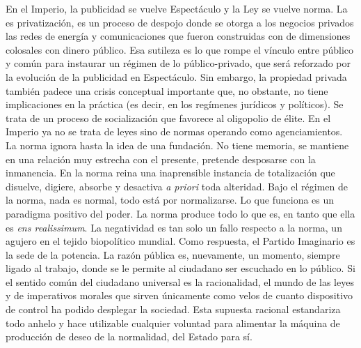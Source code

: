 En el Imperio, la publicidad se vuelve Espectáculo y la Ley se vuelve norma. La  es privatización, es un proceso de despojo donde se otorga a los negocios privados las redes de energía y comunicaciones que fueron construidas con  de dimensiones colosales con dinero público. Esa sutileza es lo que rompe el vínculo entre público y común para instaurar un régimen de lo público-privado, que será reforzado por la evolución de la publicidad en Espectáculo. Sin embargo, la propiedad privada también padece una crisis conceptual importante que, no obstante, no tiene implicaciones en la práctica (es decir, en los regímenes jurídicos y políticos). Se trata de un proceso de socialización que favorece al oligopolio de élite. En el Imperio ya no se trata de leyes sino de normas operando como agenciamientos. La norma ignora hasta la idea de una fundación. No tiene memoria, se mantiene en una relación muy estrecha con el presente, pretende desposarse con la inmanencia. En la norma reina una inaprensible instancia de totalización que disuelve, digiere, absorbe y desactiva \emph{a priori} toda alteridad. Bajo el régimen de la norma, nada es normal, todo está por normalizarse. Lo que funciona es un paradigma positivo del poder. La norma produce todo lo que es, en tanto que ella es \emph{ens realissimum}. La negatividad es tan solo un fallo respecto a la norma, un agujero en el tejido biopolítico mundial. Como respuesta, el Partido Imaginario es la sede de la potencia. La razón pública es, nuevamente, un momento, siempre ligado al trabajo, donde se le permite al ciudadano ser escuchado en lo público. Si el sentido común del ciudadano universal es la racionalidad, el mundo de las leyes y de imperativos morales que sirven únicamente como velos de cuanto dispositivo de control ha podido desplegar la sociedad. Esta supuesta racional estandariza todo anhelo y hace utilizable cualquier voluntad para alimentar la máquina de producción de deseo de la normalidad, del Estado para sí.

